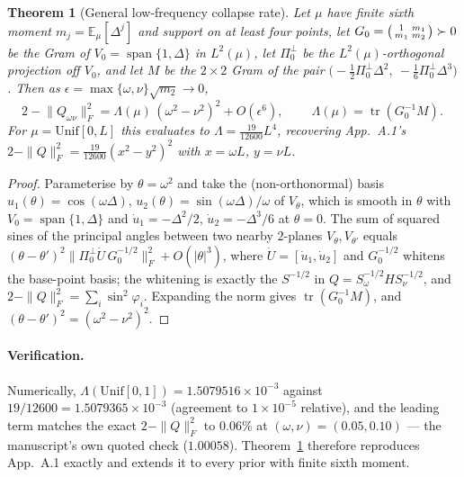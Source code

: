 \documentclass[11pt]{article}
\newtheorem{theorem}{Theorem}[section]
\theoremstyle{definition}
\newcommand{\E}{\mathbb{E}}
\DeclareMathOperator{\tr}{tr}
\DeclareMathOperator{\spn}{span}
\begin{document}
\begin{theorem}[General low-frequency collapse rate]\label{thm:collapse-general}
Let $\mu$ have finite sixth moment $m_j=\E_\mu[\Delta^j]$ and support on at least four points, let
$G_0=\begin{psmallmatrix}1&m_1\\m_1&m_2\end{psmallmatrix}\succ0$ be the Gram of
$V_0=\spn\{1,\Delta\}$ in $L^2(\mu)$, let $\Pi_0^\perp$ be the $L^2(\mu)$-orthogonal projection off
$V_0$, and let $M$ be the $2\times2$ Gram of the pair
$\bigl(-\tfrac12\Pi_0^\perp\Delta^2,\ -\tfrac16\Pi_0^\perp\Delta^3\bigr)$. Then as
$\epsilon=\max\{\omega,\nu\}\sqrt{m_2}\to0$,
\begin{equation}
2-\bigl\|Q_{\omega\nu}\bigr\|_F^2=\Lambda(\mu)\,(\omega^2-\nu^2)^2+O(\epsilon^6),
\qquad \boxed{\ \Lambda(\mu)=\tr\!\left(G_0^{-1}M\right).\ }
\label{eq:Lambda}
\end{equation}
For $\mu=\mathrm{Unif}[0,L]$ this evaluates to $\Lambda=\tfrac{19}{12600}L^4$, recovering
App.~A.1's $2-\|Q\|_F^2=\tfrac{19}{12600}(x^2-y^2)^2$ with $x=\omega L$, $y=\nu L$.
\end{theorem}

\begin{proof}
Parameterise by $\theta=\omega^2$ and take the (non-orthonormal) basis
$u_1(\theta)=\cos(\omega\Delta)$, $u_2(\theta)=\sin(\omega\Delta)/\omega$ of $V_\theta$, which is
smooth in $\theta$ with $V_0=\spn\{1,\Delta\}$ and
$\dot u_1=-\Delta^2/2$, $\dot u_2=-\Delta^3/6$ at $\theta=0$. The sum of squared sines of the
principal angles between two nearby $2$-planes $V_\theta,V_{\theta'}$ equals
$(\theta-\theta')^2\|\Pi_0^\perp\dot U\,G_0^{-1/2}\|_F^2+O(|\theta|^3)$, where $\dot U=[\dot u_1,\dot u_2]$
and $G_0^{-1/2}$ whitens the base-point basis; the whitening is exactly the $S^{-1/2}$ in
$Q=S_\omega^{-1/2}HS_\nu^{-1/2}$, and $2-\|Q\|_F^2=\sum_i\sin^2\varphi_i$. Expanding the norm gives
$\tr(G_0^{-1}M)$, and $(\theta-\theta')^2=(\omega^2-\nu^2)^2$.
\end{proof}

\paragraph{Verification.} Numerically, $\Lambda(\mathrm{Unif}[0,1])=1.5079516\times10^{-3}$ against
$19/12600=1.5079365\times10^{-3}$ (agreement to $1\times10^{-5}$ relative), and the leading term
matches the exact $2-\|Q\|_F^2$ to $0.06\%$ at $(\omega,\nu)=(0.05,0.10)$ --- the manuscript's own
quoted check ($1.00058$). Theorem~\ref{thm:collapse-general} therefore reproduces App.~A.1 exactly
and extends it to every prior with finite sixth moment.
\end{document}
